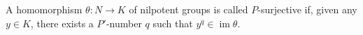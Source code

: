 A homomorphism $\theta: N \to K$ of nilpotent groups is called $P$-surjective if, given any $y \in K$, there exists a $P'$-number $q$ such that $y^q \in \operatorname{im} \theta$.
